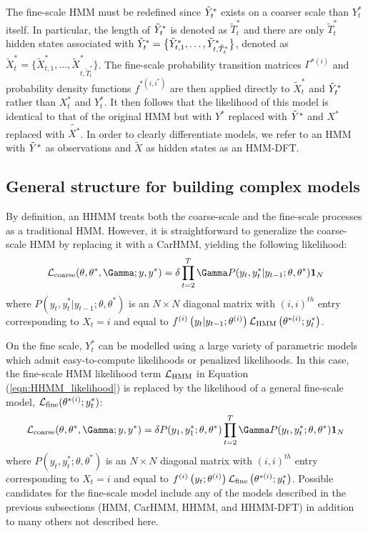 The fine-scale HMM must be redefined since $\tilde{Y}^*_t$ exists on a coarser scale than $Y^*_t$ itself. In particular, the length of $\tilde{Y}^*_t$ is denoted as $\tilde{T}_t^*$ and there are only $\tilde{T}_t^*$ hidden states associated with $\tilde{Y}^*_t = \big\{\tilde{Y}^*_{t,1},\ldots, \tilde{Y}^*_{t,\tilde{T}^*_t}\big\}$, denoted as $\tilde{X}^*_t = \big\{\tilde{X}^*_{t,1},\ldots, \tilde{X}^*_{t,\tilde{T}^*_t}\big\}$. The fine-scale probability transition matrices  $\Gamma^{*(i)}$ and probability density functions $f^{*(i,i^*)}$ are then applied directly to $\tilde{X}^*_t$ and $\tilde{Y}^*_t$ rather than $X^*_t$ and $Y^*_t$. It then follows that the likelihood of this model is identical to that of the original HMM but with $Y^*$ replaced with $\tilde{Y}^*$ and $X^*$ replaced with $\tilde{X^*}$. In order to clearly differentiate models, we refer to an HMM with $\tilde{Y}^*$ as observations and $\tilde{X}$ as hidden states as an HMM-DFT.

\subsection{General structure for building complex models}

By definition, an HHMM treats both the coarse-scale and the fine-scale processes as a traditional HMM. However, it is straightforward to generalize the coarse-scale HMM by replacing it with a CarHMM, yielding the following likelihood:
\[
\calL_{\text{coarse}}(\theta,\theta^*,\Gamma;y,y^*) = \delta \prod_{t=2}^T \Gamma P(y_t,y^*_t|y_{t-1};\theta,\theta^*) \mathbf{1}_N
\]
where $P(y_t,y^*_t|y_{t-1};\theta,\theta^*) $ is an $N \times N$ diagonal matrix with $(i,i)^{th}$ entry corresponding to $X_t=i$ and equal to $f^{(i)}\left(y_t|y_{t-1};\theta^{(i)}\right)\mathcal{L}_{\text{HMM}}\left(\theta^{*(i)};y^*_t\right)$. 

On the fine scale, $Y^*_t$ can be modelled using a large variety of parametric models which admit easy-to-compute likelihoods or penalized likelihoods. In this case, the fine-scale HMM likelihood term $\mathcal{L}_{\text{HMM}}$ in Equation (\ref{eqn:HHMM_likelihood}) is replaced by the likelihood of a general fine-scale model, $\mathcal{L}_{\text{fine}}(\theta^{*(i)};y^*_t)$:
\[
\calL_{\text{coarse}}(\theta,\theta^*,\Gamma;y,y^*) = \delta P(y_1,y^*_1;\theta,\theta^*) \prod_{t=2}^T \Gamma P(y_t,y^*_t;\theta,\theta^*) \mathbf{1}_N
\]
where $P(y_t,y^*_t;\theta,\theta^*) $ is an $N \times N$ diagonal matrix with $(i,i)^{th}$ entry corresponding to $X_t=i$ and equal to $f^{(i)}\left(y_t;\theta^{(i)}\right)\mathcal{L}_{\text{fine}}\left(\theta^{*(i)};y^*_t\right)$. 
%
Possible candidates for the fine-scale model include any of the models described in the previous subsections (HMM, CarHMM, HHMM, and HHMM-DFT) in addition to many others not described here.


